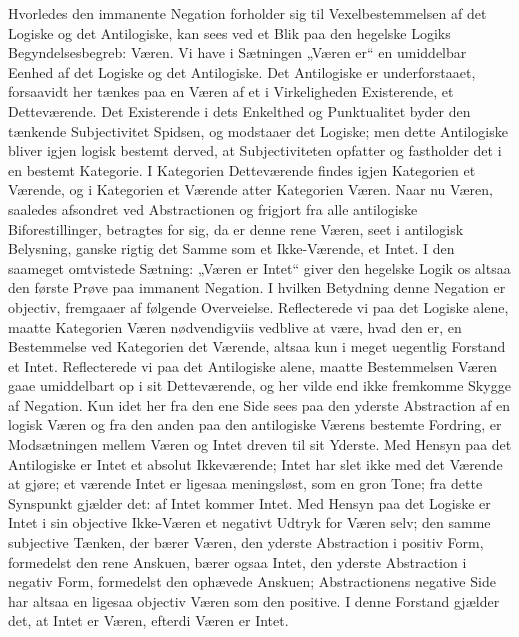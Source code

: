 \documentclass[11pt]{book}
\newcommand{\opage}[1]{\marginnote{\footnotesize\textit{[#1]}}}
\begin{document}
Hvorledes den immanente Negation forholder sig til
Vexelbestemmelsen af det Logiske og det Antilogiske, kan sees ved et
Blik paa den hegelske Logiks Begyndelsesbegreb: Væren. Vi have i
Sætningen „Væren er“ en umiddelbar Eenhed af det Logiske og det
Antilogiske. Det Antilogiske er underforstaaet, forsaavidt her tænkes
paa en Væren af et i Virkeligheden Existerende, et Detteværende. Det
Existerende i dets Enkelthed og Punktualitet byder den tænkende
Subjectivitet Spidsen, og modstaaer det Logiske; men dette Antilogiske
bliver igjen logisk bestemt derved, at Subjectiviteten opfatter og
fastholder det i en bestemt Kategorie. I Kategorien Detteværende
findes igjen Kategorien et Værende, og i Kategorien
\opage{150} \setcounter{footnote}{0}%
et Værende atter Kategorien Væren. Naar nu Væren, saaledes afsondret
ved Abstractionen og frigjort fra alle antilogiske Biforestillinger,
betragtes for sig, da er denne rene Væren, seet i antilogisk
Belysning, ganske rigtig det Samme som et Ikke-Værende, et Intet. I
den saameget omtvistede Sætning: „Væren er Intet“ giver den hegelske
Logik os altsaa den første Prøve paa immanent Negation. I hvilken
Betydning denne Negation er objectiv, fremgaaer af følgende
Overveielse. Reflecterede vi paa det Logiske alene, maatte Kategorien
Væren nødvendigviis vedblive at være, hvad den er, en Bestemmelse ved
Kategorien det Værende, altsaa kun i meget uegentlig Forstand et
Intet. Reflecterede vi paa det Antilogiske alene, maatte Bestemmelsen
Væren gaae umiddelbart op i sit Detteværende, og her vilde end ikke
fremkomme Skygge af Negation. Kun idet her fra den ene Side sees paa
den yderste Abstraction af en logisk Væren og fra den anden paa den
antilogiske Værens bestemte Fordring, er Modsætningen mellem Væren og
Intet dreven til sit Yderste. Med Hensyn paa det Antilogiske er Intet
et absolut Ikkeværende; Intet har slet ikke med det Værende at gjøre;
et værende Intet er ligesaa meningsløst, som en
gron Tone; fra dette Synspunkt gjælder det: af Intet kommer Intet. Med
Hensyn paa det Logiske er Intet i sin objective Ikke-Væren et negativt
Udtryk for Væren selv; den samme subjective Tænken, der bærer Væren,
den yderste Abstraction i positiv Form, formedelst den rene Anskuen,
bærer ogsaa Intet, den yderste Abstraction i negativ Form, formedelst
den ophævede Anskuen; Abstractionens negative Side har altsaa en
ligesaa objectiv Væren som den positive. I denne Forstand gjælder det,
at Intet er Væren, efterdi Væren er Intet.
\end{document}
